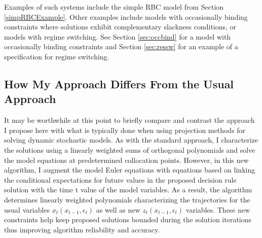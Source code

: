 \documentclass[12pt]{article}
\begin{document}
 Examples of such systems include the simple RBC model from Section
\ref{simpRBCExample}.
Other examples include  models with 
occasionally binding constraints where solutions 
exhibit complementary slackness conditions, or models with 
regime switching.   See Section \ref{sec:occbind} for a model with
occasionally binding constraints and
Section \ref{sec:ressw} for an example 
of a specification for regime switching.






\subsection{How My Approach Differs From the Usual Approach}
\label{sec:walkthrough}


It may be worthwhile at this point
to briefly compare and contrast the approach I propose here with 
what is typically done when using projection methods 
for solving dynamic stochastic models.
As with the standard approach, I characterize the solutions using a linearly
weighted sums of orthogonal polynomials and solve the model equations
at predetermined collocation points. However, in this new algorithm, I 
augment the model Euler equations with equations based on 
  linking the conditional expectations for future values in
the proposed decision rule solution with the
time t value of the model variables.  As a result, the algorithm determines
linearly weighted polynomials characterizing the 
trajectories for the usual
variables $x_t(x_{t-1},\epsilon_t)$ as well as new  $z_t(x_{t-1},\epsilon_t)$ variables.  These new constraints 
help keep proposed solutions bounded during the solution iterations 
thus improving algorithm reliability and accuracy.




\end{document}

